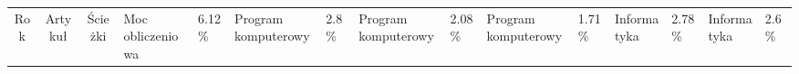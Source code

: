 \begin{tabular}{|c|c|c|}
	\hline
	Rok &	Artykuł &	Ścieżki  &	Moc obliczeniowa &	6.12\%  &	Program komputerowy &	2.8\%  &	Program komputerowy &	2.08\%  &	Program komputerowy &	1.71\%  &	Informatyka &	2.78\%  &	Informatyka &	2.6\% \nl
\end{tabular}